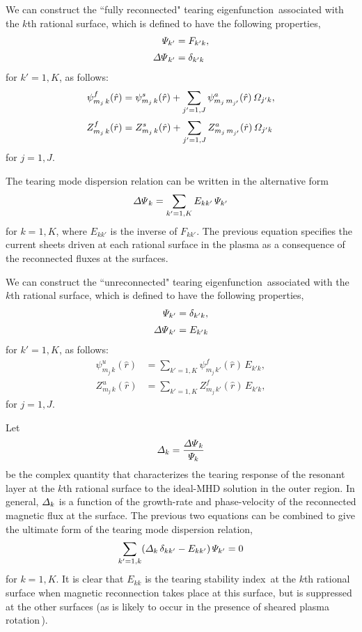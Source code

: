 \documentclass[12pt,prb,aps]{revtex4-1}
\begin{document}
We can construct the ``fully reconnected" tearing eigenfunction\,\cite{am1} associated with the $k$th rational surface,
which is defined to have the following properties, 
\begin{align}
{\mit\Psi}_{k' }&= F_{k'k},\\[0.5ex]
{\mit\Delta\Psi}_{k'} &= \delta_{k'k}
\end{align}
for $k'=1,K$, 
as follows: 
\begin{align}
\psi_{m_j\,k}^{f}(\hat{r}) &=\psi^s_{m_j\,k}(\hat{r})+ \sum_{j'=1,J}\psi_{m_j\,m_{j'}}^a(\hat{r})\,{\mit\Omega}_{j'k},\\[0.5ex]
Z_{m_j\,k}^{f}(\hat{r}) &=Z^s_{m_j\,k}(\hat{r})+ \sum_{j'=1,J}Z_{m_j\,m_{j'}}^a(\hat{r})\,{\mit\Omega}_{j'k}
\end{align}
for $j=1,J$.

The tearing mode dispersion relation can be written in the alternative form\,\cite{cht,am1}
\begin{equation}\label{e317}
{\mit\Delta\Psi}_k = \sum_{k'=1,K}E_{kk'}\,{\mit\Psi}_{k'}
\end{equation}
for $k=1,K$, where $E_{kk'}$ is the inverse of $F_{kk'}$. The previous equation specifies the current sheets driven at each rational surface
in the plasma as a consequence of the reconnected fluxes at the surfaces. 

We can construct the ``unreconnected" tearing eigenfunction\,\cite{am1} associated with the $k$th rational surface,
which is defined to have the following properties, 
\begin{align}
{\mit\Psi}_{k' }&= \delta_{k'k},\\[0.5ex]
{\mit\Delta\Psi}_{k'} &= E_{k'k}
\end{align}
for $k'=1,K$, 
as follows: 
\begin{align}
\psi_{m_j\,k}^{u}(\hat{r}) &=\sum_{k'=1,K}\psi_{m_j\,k'}^{f}(\hat{r})\,E_{k'k},\\[0.5ex]
Z_{m_j\,k}^{u}(\hat{r}) &=\sum_{k'=1,K}Z_{m_j\,k'}^{f}(\hat{r})\,E_{k'k},
\end{align}
for $j=1,J$.

Let
\begin{equation}
{\mit\Delta}_k = \frac{{\mit\Delta\Psi}_k}{{\mit\Psi}_k}
\end{equation}
 be the complex quantity that characterizes the
tearing response of the resonant layer at the $k$th rational surface to the ideal-MHD solution in the outer region.\cite{fkr}
In general, ${\mit\Delta}_k$ is a function of the growth-rate and phase-velocity of the reconnected magnetic flux at the surface.\cite{am1,layer,layer1}
The previous two equations can be combined to give the ultimate form of the tearing mode dispersion relation,
\begin{equation}
\sum_{k'=1,k}({\mit\Delta}_k\,\delta_{kk'}-E_{kk'})\,{\mit\Psi}_{k'} = 0
\end{equation}
for $k=1,K$. It is clear that $E_{kk}$ is the tearing stability index\,\cite{fkr} at the $k$th rational surface when magnetic reconnection  takes place
at this surface, but is suppressed at the other surfaces (as is likely to occur in the presence of sheared plasma rotation\,\cite{am1}). 
\end{document}
